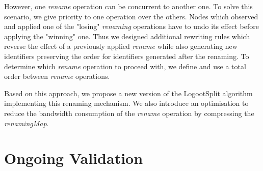 \documentclass[sigplan]{acmart}
\begin{document}
However, one \emph{rename} operation can be concurrent to another one.
To solve this scenario, we give priority to one operation over the others.
Nodes which observed and applied one of the "losing" \emph{renaming} operations have to undo its effect before applying the "winning" one.
Thus we designed additional rewriting rules which reverse the effect of a previously applied \emph{rename} while also generating new identifiers preserving the order for identifiers generated after the renaming.
To determine which \emph{rename} operation to proceed with, we define and use a total order between \emph{rename} operations.

Based on this approach, we propose a new version of the LogootSplit algorithm implementing this renaming mechanism.
We also introduce an optimisation to reduce the bandwidth consumption of the \emph{rename} operation by compressing the \emph{renamingMap}.

\section{Ongoing Validation}

\end{document}

